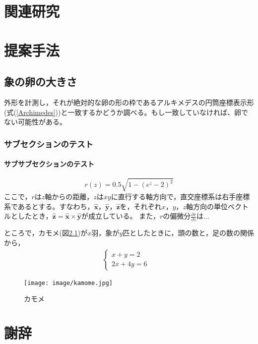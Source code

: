 \documentclass[bachelor]{INIAD}%
\begin{document}
\chapter{関連研究}

\chapter{提案手法}

\section{象の卵の大きさ}
外形を計測し，それが絶対的な卵の形の枠であるアルキメデスの円筒座標表示形(式(\ref{Archimedes}))と一致するかどうか調べる。もし一致していなければ、卵でない可能性がある。
\subsection{サブセクションのテスト}
\subsubsection{サブサブセクションのテスト}
\begin{equation}
r(z)=0.5\sqrt{1-(e^z-2)^2}
\label{Archimedes}
\end{equation}
ここで，$r$は$z$軸からの距離，$z$は$xy$に直行する軸方向で，直交座標系は右手座標系であるとする。すなわち，$\hat{\bm{x}}$，$\hat{\bm{y}}$，$\hat{\bm{z}}$を，それぞれ$x$，$y$，$z$軸方向の単位ベクトルとしたとき，$\hat{\bm{z}} = \hat{\bm{x}} \times \hat{\bm{y}}$が成立している。
また，$r$の偏微分$\frac{\partial r}{\partial z}$は...

ところで，カモメ(図\ref{kamome})が$x$羽，象が$y$匹としたときに，頭の数と，足の数の関係から，
\begin{eqnarray}
  \begin{cases}
    x + y = 2 & \\
    2x + 4y = 6 &
  \end{cases}
\end{eqnarray}

\begin{figure}[tb]
  \begin{center}
   \texttt{[image: image/kamome.jpg]}
  \end{center}
  \caption{カモメ}
  \label{kamome}
\end{figure}


\backmatter%
\chapter{謝辞}%



\appendix%
\chapter{}
\end{document}
